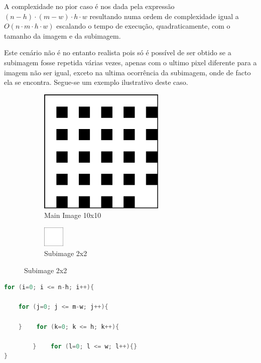 \documentclass{report}
\begin{document}
A complexidade no pior caso é nos dada pela expressão \((n-h) \cdot (m-w) \cdot h \cdot w\) resultando numa ordem de complexidade igual a \(O(n \cdot m \cdot h \cdot w)\) escalando o tempo de execução, quadraticamente, 
com o tamanho da imagem e da subimagem.

Este cenário não é no entanto realista pois só é possível de ser obtido se a subimagem fosse repetida várias vezes, apenas com o ultimo pixel diferente para a imagem não ser igual, exceto na ultima ocorrência da subimagem, onde de facto ela se encontra. Segue-se um exemplo ilustrativo deste caso.


\begin{figure}[h]

\begin{subfigure}{0.5\textwidth}
\includegraphics[width=0.9\linewidth, height=6cm]{Screenshot from 2023-11-24 15-30-46.png}
\caption{Main Image 10x10}
\end{subfigure}
\begin{subfigure}{0.5\textwidth}
\hspace{33mm}
\includegraphics[width=0.15\linewidth, height=1cm]{Screenshot from 2023-11-24 15-33-07.png} 
\caption{Subimage 2x2}
\end{subfigure}
\end{figure}



\begingroup
\begin{lstlisting}[language=C]
for (i=0; i <= n-h; i++){
    
    for (j=0; j <= m-w; j++){
            
    }    for (k=0; k <= h; k++){
            
        }    for (l=0; l <= w; l++){}
}
\end{lstlisting}
\endgroup
\end{document}
